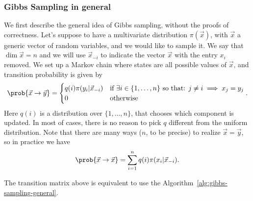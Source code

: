   \subsubsection{Gibbs Sampling in general}
  We first describe the general idea of Gibbs sampling, without the proofs of correctness.
  Let's suppose to have a multivariate distribution \(\pi{(\vec{x})}\), with \(\vec{x}\) a
  generic vector of random variables, and we would like to sample it.
  We say that \(\dim{\vec{x}} = n\) and we will use \(\vec{x}_{-i}\) to indicate the vector
  \(\vec{x}\) with the entry \(x_i\) removed.
  We set up a Markov chain where states are all possible values of \(\vec{x}\), and transition
  probability is given by
  \[
    \prob{\vec{x} \to \vec{y}} = 
      \begin{cases}
        q{(i)} \pi{(y_i|\vec{x}_{-i})} &
          \text{if } \exists i \in \{1,\dots,n\} \text{ so that: } j\neq i \implies x_j = y_j\\
        0 &\text{otherwise}
      \end{cases}.
  \]
  Here \(q{(i)}\) is a distribution over \(\{1,\dots,n\}\), that chooses which component is
  updated. In most of cases, there is no reason to pick \(q\) different from the uniform
  distribution. Note that there are many ways (\(n\), to be precise) to realize \(\vec{x} = \vec{y}\),
  so in practice we have 
  \[
    \prob{\vec{x} \to \vec{x}} = \sum_{i=1}^{n} q{(i)} \pi{(x_i|\vec{x}_{-i})}.
  \]
  
  The transition matrix above is equivalent to use the Algorithm~\ref{alg:gibbs-sampling-general}.
  
